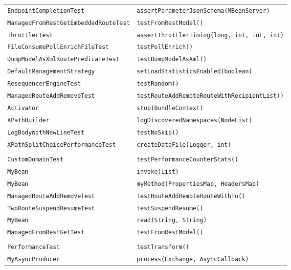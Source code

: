 \begin{center}
\begin{longtable}{ll}
\lstinline/EndpointCompletionTest/&{\lstinline/assertParameterJsonSchema(MBeanServer)/}\\
\lstinline/ManagedFromRestGetEmbeddedRouteTest/&{\lstinline/testFromRestModel()/}\\
\lstinline/ThrottlerTest/&{\lstinline/assertThrottlerTiming(long, int, int, int)/}\\
\lstinline/FileConsumePollEnrichFileTest/&{\lstinline/testPollEnrich()/}\\
\lstinline/DumpModelAsXmlRoutePredicateTest/&{\lstinline/testDumpModelAsXml()/}\\
\lstinline/DefaultManagementStrategy/&{\lstinline/setLoadStatisticsEnabled(boolean)/}\\
\lstinline/ResequencerEngineTest/&{\lstinline/testRandom()/}\\
\lstinline/ManagedRouteAddRemoveTest/&{\lstinline/testRouteAddRemoteRouteWithRecipientList()/}\\
\lstinline/Activator/&{\lstinline/stop(BundleContext)/}\\
\lstinline/XPathBuilder/&{\lstinline/logDiscoveredNamespaces(NodeList)/}\\
\lstinline/LogBodyWithNewLineTest/&{\lstinline/testNoSkip()/}\\
\lstinline/XPathSplitChoicePerformanceTest/&{\lstinline/createDataFile(Logger, int)/}\\
\raisebox{-13pt}{\shortstack{\lstinline/ManagedRouteDumpStatsAsXml/-\\\lstinline/CustomDomainTest/}}&{\lstinline/testPerformanceCounterStats()/}\\
\lstinline/MyBean/&{\lstinline/invoke(List)/}\\
\lstinline/MyBean/&{\lstinline/myMethod(PropertiesMap, HeadersMap)/}\\
\lstinline/ManagedRouteAddRemoveTest/&{\lstinline/testRouteAddRemoteRouteWithTo()/}\\
\lstinline/TwoRouteSuspendResumeTest/&{\lstinline/testSuspendResume()/}\\
\lstinline/MyBean/&{\lstinline/read(String, String)/}\\
\lstinline/ManagedFromRestGetTest/&{\lstinline/testFromRestModel()/}\\
\raisebox{-13pt}{\shortstack{\lstinline/TypeConverterRegistryStats/-\\\lstinline/PerformanceTest/}}&{\lstinline/testTransform()/}\\
\lstinline/MyAsyncProducer/&{\lstinline/process(Exchange, AsyncCallback)/}\\

\end{longtable}
\end{center}
